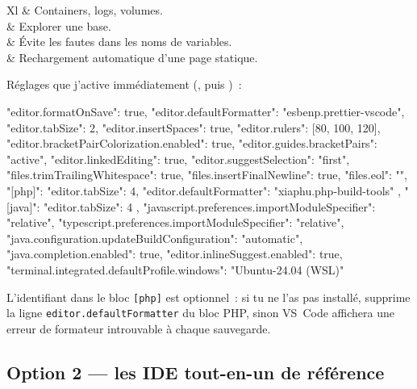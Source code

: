 \begin{tabz}{Xl}
   \& Containers, logs, volumes.\\
   \& Explorer une base.\\
   \& \'Evite les fautes dans les noms de variables.\\
   \& Rechargement automatique d'une page statique.\\
\end{tabz}

R\'eglages que j'active imm\'ediatement (, puis )~:

\begin{codejson}
{
  "editor.formatOnSave": true,
  "editor.defaultFormatter": "esbenp.prettier-vscode",
  "editor.tabSize": 2,
  "editor.insertSpaces": true,
  "editor.rulers": [80, 100, 120],
  "editor.bracketPairColorization.enabled": true,
  "editor.guides.bracketPairs": "active",
  "editor.linkedEditing": true,
  "editor.suggestSelection": "first",
  "files.trimTrailingWhitespace": true,
  "files.insertFinalNewline": true,
  "files.eol": "\n",
  "[php]": { "editor.tabSize": 4, "editor.defaultFormatter": "xiaphu.php-build-tools" },
  "[java]": { "editor.tabSize": 4 },
  "javascript.preferences.importModuleSpecifier": "relative",
  "typescript.preferences.importModuleSpecifier": "relative",
  "java.configuration.updateBuildConfiguration": "automatic",
  "java.completion.enabled": true,
  "editor.inlineSuggest.enabled": true,
  "terminal.integrated.defaultProfile.windows": "Ubuntu-24.04 (WSL)"
}
\end{codejson}

\begin{note}
L'identifiant  dans le bloc \verb|[php]| est optionnel~:
si tu ne l'as pas install\'e, supprime la ligne \verb|editor.defaultFormatter| du bloc PHP,
sinon VS~Code affichera une erreur de formateur introuvable \`a chaque sauvegarde.
\end{note}

\subsection{Option 2 --- les IDE \og  tout-en-un  \fg{} de r\'ef\'erence}

